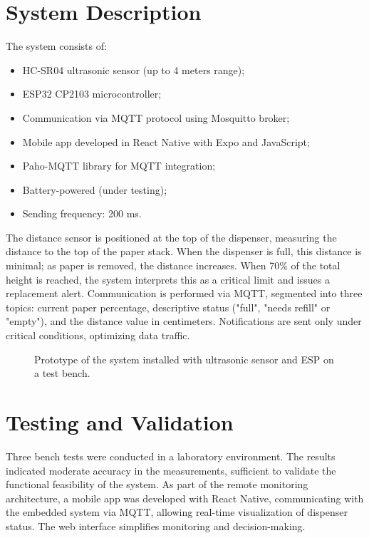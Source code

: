 \documentclass[english,hidelinks]{sbrt}
\begin{document}
\section{System Description}
The system consists of:
\begin{itemize}
    \item HC-SR04 ultrasonic sensor (up to 4 meters range);
    \item ESP32 CP2103 microcontroller;
    \item Communication via MQTT protocol using Mosquitto broker;
    \item Mobile app developed in React Native with Expo and JavaScript;
    \item Paho-MQTT library for MQTT integration;
    \item Battery-powered (under testing);
    \item Sending frequency: 200 ms.
\end{itemize}
The distance sensor is positioned at the top of the dispenser, measuring the distance to the top of the paper stack. When the dispenser is full, this distance is minimal; as paper is removed, the distance increases. When 70\% of the total height is reached, the system interprets this as a critical limit and issues a replacement alert. Communication is performed via MQTT, segmented into three topics: current paper percentage, descriptive status ("full", "needs refill" or "empty"), and the distance value in centimeters. Notifications are sent only under critical conditions, optimizing data traffic.

\begin{figure}[H]
  \centering
  \caption{Prototype of the system installed with ultrasonic sensor and ESP on a test bench.}
  \label{fig:sistema}
\end{figure}

\section{Testing and Validation}
Three bench tests were conducted in a laboratory environment. The results indicated moderate accuracy in the measurements, sufficient to validate the functional feasibility of the system. As part of the remote monitoring architecture, a mobile app was developed with React Native, communicating with the embedded system via MQTT, allowing real-time visualization of dispenser status. The web interface simplifies monitoring and decision-making.
\end{document}
